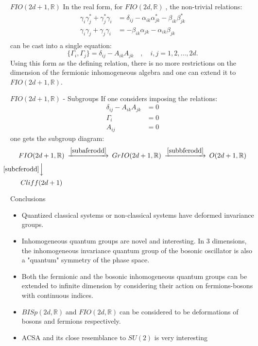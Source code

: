 \documentclass[pdf,colorBG,slideColor,fyma]{prosper}
\newcommand{\beq}{\[}
\newcommand{\eeq}{\]}
\def\IR{\mathbb{R}}
\def\FIO{$FIO(2d, \IR)\;$}
\def\BISp{$BISp(2d, \IR)\;$}
\begin{document}
\begin{slide}{$FIO(2d + 1, \IR)$}
In the real form, for \FIO, the non-trivial relations:
\begin{align*}
\gamma_i \gamma^*_j + \gamma^*_j \gamma_i &= \delta_{ij} - \alpha_{ik}\alpha^*_{jk} - \beta_{ik} \beta^*_{jk} \\
\gamma_i \gamma_j + \gamma_j \gamma_i &= - \beta_{ik} \alpha_{jk} - \alpha_{ik} \beta_{jk} \\
\end{align*}
can be cast into a single equation:
\beq
\{\Gamma_i, \Gamma_j\} = \delta_{ij} - A_{ik} A_{jk} \quad,\quad i, j = 1, 2, \ldots , 2d .
\eeq
Using this form as the defining relation, there is no more restrictions
on the dimension of the fermionic inhomogeneous algebra and one can extend it to
$FIO(2d + 1, \IR)$.
\end{slide}


\begin{slide}{$FIO(2d + 1, \IR)$ - Subgroups}
If one considers imposing the relations:
\begin{subequations}
\begin{align}
\delta_{ij} - A_{ik}A_{jk} &= 0 \label{subaferodd} \\
\Gamma_i &= 0 \label{subbferodd} \\
A_{ij} &= 0 \label{subcferodd}
\end{align}
\end{subequations}
one gets the subgroup diagram:
    \[
    \begin{CD}
    {FIO(2d + 1, \IR)} @>\eqref{subaferodd}>> {GrIO(2d + 1, \IR)} @>\eqref{subbferodd}>> {O(2d + 1, \IR)} \\
    @V\eqref{subcferodd}VV\\
    {Cliff(2d + 1)}
    \end{CD}
    \]
\end{slide}


\begin{slide}{Conclusions}
\begin{itemize}
  \item{Quantized classical systems or non-classical systems have deformed invariance
    groups.}
  \item{Inhomogeneous quantum groups are novel and interesting. In 3 dimensions, the inhomogeneous
    invariance quantum group of the bosonic oscillator is also a "quantum" symmetry of the phase space.}
  \item{Both the fermionic and the bosonic inhomogeneous quantum groups can be extended to infinite
    dimension by considering their action on fermions-bosons with continuous indices.}
  \item{\BISp and \FIO can be considered to be deformations of bosons and fermions respectively.}
  \item{ACSA and its close resemblance to $SU(2)$ is very interesting}
\end{itemize}
\end{slide}
\end{document}
